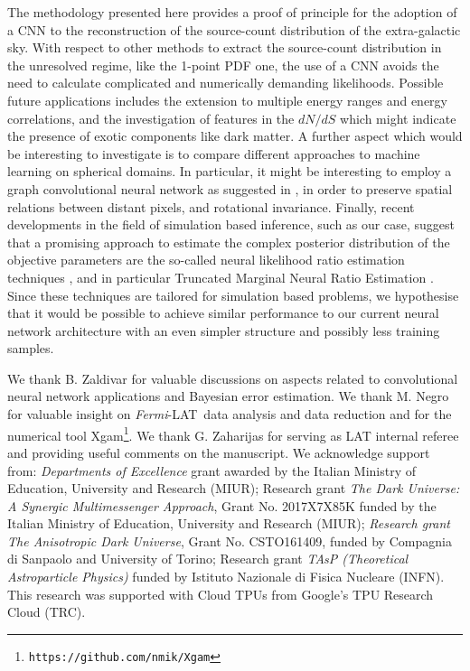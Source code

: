 \documentclass[a4paper,11pt]{article}
\newcommand{\fermi}{\textsl{Fermi}-LAT\ }
\begin{document}
 The methodology presented here provides a proof of principle for the adoption of a CNN to the reconstruction of the source-count distribution of the extra-galactic sky. 
With respect to other methods to extract the source-count distribution in the unresolved regime, like the 1-point PDF one, the use of a CNN avoids the need to calculate complicated and numerically demanding likelihoods.
 Possible future applications includes the extension to multiple energy ranges and energy correlations, and the investigation of features in the $dN/dS$ which might indicate the presence of exotic components like dark matter.
A further aspect which would be interesting to investigate is to compare different approaches to machine learning on spherical domains. In particular, it might be interesting to employ a graph convolutional neural network as suggested in \cite{DBLP:journals/corr/abs-2012-15000}, in order to preserve spatial relations between distant pixels, and rotational invariance.
Finally, recent developments in the field of simulation based inference, such as our case, suggest that a promising approach to estimate the complex posterior distribution of the objective parameters are the so-called neural likelihood ratio estimation techniques \cite{Durkan2020}, and in particular Truncated Marginal Neural Ratio Estimation \cite{Miller2021arxiv,Miller2021,AnauMontel:2022ppb}. Since these techniques are tailored for simulation based problems, we hypothesise that it would be possible to achieve similar performance to our current neural network architecture with an even simpler structure and possibly less training samples. 
 
 

\label{sec:conclusions}



\acknowledgments
 We thank B. Zaldivar for valuable discussions on aspects related to convolutional neural network applications and Bayesian error estimation. We thank M. Negro for valuable insight on \fermi data analysis and data reduction and for the numerical tool Xgam\footnote{\verb|https://github.com/nmik/Xgam|}. 
 We thank G. Zaharijas for serving as LAT internal referee and providing useful comments on the manuscript.  
We acknowledge support from: \textsl{Departments of Excellence} grant awarded by the Italian Ministry of Education, University and Research (MIUR); Research grant \textsl{The Dark Universe: A Synergic Multimessenger Approach}, Grant No. 2017X7X85K funded by the Italian Ministry of Education, University and Research (MIUR); \textsl{Research grant The Anisotropic Dark Universe}, Grant No. CSTO161409, funded by Compagnia di Sanpaolo and University of Torino; Research grant \textsl{TAsP (Theoretical Astroparticle Physics)} funded by Istituto Nazionale di Fisica Nucleare (INFN). 
This research was supported with Cloud TPUs from Google's TPU Research Cloud (TRC).
\end{document}
